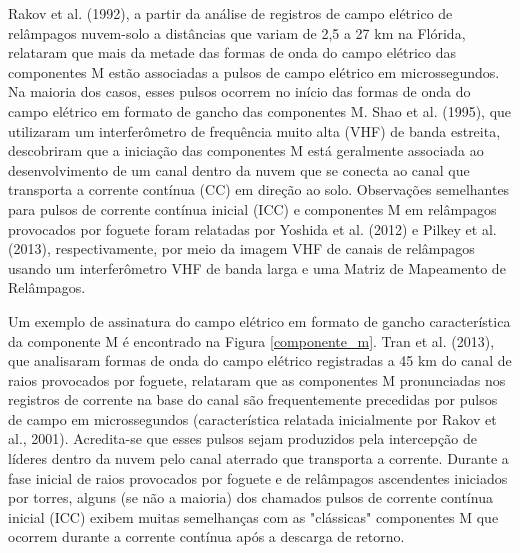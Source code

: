 \documentclass[a4paper, 12pt, onecolumn,singlespacing]{article}
\begin{document}
		Rakov et al. (1992), a partir da análise de registros de campo elétrico de relâmpagos nuvem-solo a distâncias que variam de 2,5 a 27 km na Flórida, relataram que mais da metade das formas de onda do campo elétrico das componentes M estão associadas a pulsos de campo elétrico em microssegundos. Na maioria dos casos, esses pulsos ocorrem no início das formas de onda do campo elétrico em formato de gancho das componentes M. Shao et al. (1995), que utilizaram um interferômetro de frequência muito alta (VHF) de banda estreita, descobriram que a iniciação das componentes M está geralmente associada ao desenvolvimento de um canal dentro da nuvem que se conecta ao canal que transporta a corrente contínua (CC) em direção ao solo. Observações semelhantes para pulsos de corrente contínua inicial (ICC) e componentes M em relâmpagos provocados por foguete foram relatadas por Yoshida et al. (2012) e Pilkey et al. (2013), respectivamente, por meio da imagem VHF de canais de relâmpagos usando um interferômetro VHF de banda larga e uma Matriz de Mapeamento de Relâmpagos.
		
		Um exemplo de assinatura do campo elétrico em formato de gancho característica da componente M é encontrado na Figura \ref{componente_m}. Tran et al. (2013), que analisaram formas de onda do campo elétrico registradas a 45 km do canal de raios provocados por foguete, relataram que as componentes M pronunciadas nos registros de corrente na base do canal são frequentemente precedidas por pulsos de campo em microssegundos (característica relatada inicialmente por Rakov et al., 2001). Acredita-se que esses pulsos sejam produzidos pela intercepção de líderes dentro da nuvem pelo canal aterrado que transporta a corrente. Durante a fase inicial de raios provocados por foguete e de relâmpagos ascendentes iniciados por torres, alguns (se não a maioria) dos chamados pulsos de corrente contínua inicial (ICC) exibem muitas semelhanças com as "clássicas" componentes M que ocorrem durante a corrente contínua após a descarga de retorno.
		
\end{document}

